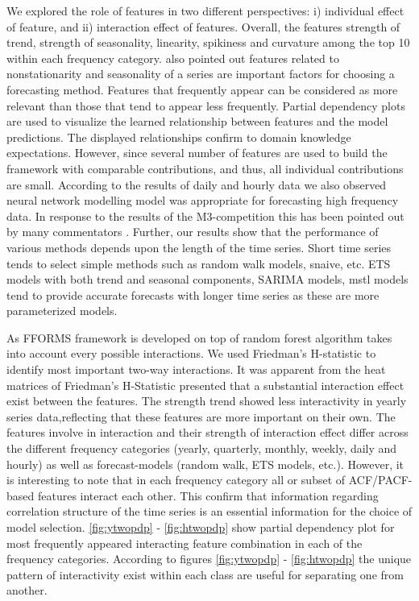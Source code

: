 \documentclass[11pt,a4paper,]{article}
\begin{document}
We explored the role of features in two different perspectives: i)
individual effect of feature, and ii) interaction effect of features.
Overall, the features strength of trend, strength of seasonality,
linearity, spikiness and curvature among the top 10 within each
frequency category. \textcite{lemke2010meta} also pointed out features
related to nonstationarity and seasonality of a series are important
factors for choosing a forecasting method. Features that frequently
appear can be considered as more relevant than those that tend to appear
less frequently. Partial dependency plots are used to visualize the
learned relationship between features and the model predictions. The
displayed relationships confirm to domain knowledge expectations.
However, since several number of features are used to build the
framework with comparable contributions, and thus, all individual
contributions are small. According to the results of daily and hourly
data we also observed neural network modelling model was appropriate for
forecasting high frequency data. In response to the results of the
M3-competition this has been pointed out by many commentators
\autocite{makridakis2000m3}. Further, our results show that the
performance of various methods depends upon the length of the time
series. Short time series tends to select simple methods such as random
walk models, snaive, etc. ETS models with both trend and seasonal
components, SARIMA models, mstl models tend to provide accurate
forecasts with longer time series as these are more parameterized
models.

As FFORMS framework is developed on top of random forest algorithm takes
into account every possible interactions. We used Friedman's H-statistic
to identify most important two-way interactions. It was apparent from
the heat matrices of Friedman's H-Statistic presented that a substantial
interaction effect exist between the features. The strength trend showed
less interactivity in yearly series data,reflecting that these features
are more important on their own. The features involve in interaction and
their strength of interaction effect differ across the different
frequency categories (yearly, quarterly, monthly, weekly, daily and
hourly) as well as forecast-models (random walk, ETS models, etc.).
However, it is interesting to note that in each frequency category all
or subset of ACF/PACF-based features interact each other. This confirm
that information regarding correlation structure of the time series is
an essential information for the choice of model selection.
\autoref{fig:ytwopdp} - \autoref{fig:htwopdp} show partial dependency
plot for most frequently appeared interacting feature combination in
each of the frequency categories. According to figures
\autoref{fig:ytwopdp} - \autoref{fig:htwopdp} the unique pattern of
interactivity exist within each class are useful for separating one from
another.
\end{document}
